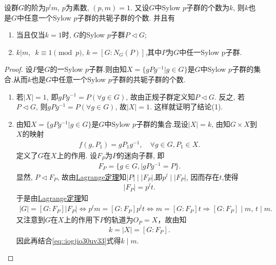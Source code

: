 \documentclass[../../main.tex]{subfiles}%
\begin{document}
\begin{theorem}[Sylow第三定理]\label{theorem:Sylow第三定理}
设群$G$的阶为$p^lm$, $p$为素数, $(p,m)=1$. 又设$G$中Sylow $p$子群的个数为$k$, 则$k$也是$G$中任意一个Sylow $p$子群的共轭子群的个数.
并且有
\begin{enumerate}[(1)]
\item\label{theorem:Sylow第三定理-1} 当且仅当$k=1$时, $G$的Sylow $p$子群$P\lhd G$;

\item\label{theorem:Sylow第三定理-2} $k|m$, $\,\,k\equiv 1\pmod{p}$,$\,\,k=[G:N_G(P)]$,其中$P$为$G$中任一Sylow p子群.
\end{enumerate}
\end{theorem}
\begin{proof}
设$P$是$G$的一Sylow $p$子群.则由知$X=\{gPg^{-1}|g\in G\}$是$G$中Sylow $p$子群的集合.从而$k$也是$G$中任意一个Sylow $p$子群的共轭子群的个数.
\begin{enumerate}[(1)]
\item 若$|X|=1$, 即$gPg^{-1}=P(\forall g\in G)$, 故由正规子群定义知$P\lhd G$. 反之, 若$P\lhd G$, 则$gPg^{-1}=P(\forall g\in G)$, 故$|X|=1$. 这样就证明了结论(1).

\item 由知$X=\{gPg^{-1}|g\in G\}$是$G$中Sylow $p$子群的集合.现设$|X|=k$, 由知$G\times X$到$X$的映射
\begin{align*}
f(g,P_1)=gP_1g^{-1}, \quad \forall g\in G, P_1\in X.
\end{align*}
定义了$G$在$X$上的作用. 设$F_P$为$P$的迷向子群, 即
\begin{align*}
F_P=\{g\in G, |gPg^{-1}=P\}.
\end{align*}
显然, $P\lhd F_P$, 故由\hyperref[theorem:抽象代数--Lagrange定理]{Lagrange定理}知$|P|\mid |F_P|$,即$p^l\mid |F_P|$, 因而存在$t$,使得
\begin{align}\label{eq::90j243gy5yhserfgdjirzz}
|F_P|=p^lt.
\end{align}
于是由\hyperref[theorem:抽象代数--Lagrange定理]{Lagrange定理}知
\begin{align}\label{eq::iogjio30uv33}
|G|=[G:F_P]|F_P| \iff p^lm=[G:F_P]p^lt \iff m=[G:F_P]t\Longrightarrow [G:F_P] \mid m,\, t\mid m.
\end{align}
又注意到$G$在$X$上的作用下$P$的轨道为$O_P=X$，故由知
\begin{align*}
k=|X|=[G:F_P].
\end{align*}
因此再结合\eqref{eq::iogjio30uv33}式得$k\mid m$.


\end{enumerate}
\end{proof}
\end{document}
